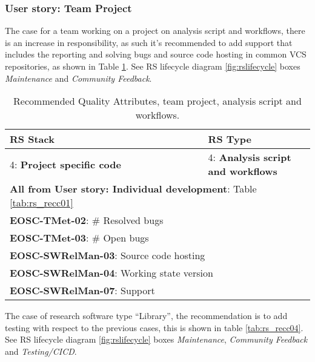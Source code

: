 \subsubsection{User story: Team Project}

The case for a team working on a project on analysis script and workflows, there is an increase in responsibility, as such it's recommended to add support that includes the reporting and solving bugs and source code hosting in common VCS repositories, as shown in Table \ref{tab:rs_recc03}. See RS lifecycle diagram \ref{fig:rslifecycle} boxes \textit{Maintenance} and \textit{Community Feedback}.

\begin{center}
\begin{table}
  \small
  \begin{tabular}{|p{0.65\linewidth}|p{0.35\linewidth}|} \hline

    \textbf{RS Stack} & \textbf{RS Type} \\ \hline \hline
    4: \textbf{Project specific code} &
    4: \textbf{Analysis script and workflows} \\ \hline \hline
    \multicolumn{2}{|l|}{\textbf{All from User story: Individual development}: Table \ref{tab:rs_recc01}} \\ \hline
    \multicolumn{2}{|l|}{\textbf{EOSC-TMet-02}: \# Resolved bugs} \\ \hline
    \multicolumn{2}{|l|}{\textbf{EOSC-TMet-03}: \# Open bugs} \\ \hline
    \multicolumn{2}{|l|}{\textbf{EOSC-SWRelMan-03}: Source code hosting} \\ \hline
    \multicolumn{2}{|l|}{\textbf{EOSC-SWRelMan-04}: Working state version} \\ \hline
    \multicolumn{2}{|l|}{\textbf{EOSC-SWRelMan-07}: Support} \\ \hline

  \end{tabular}
  \caption{Recommended Quality Attributes, team project, analysis script and workflows.}
  \label{tab:rs_recc03}
\end{table}
\end{center}

The case of research software type ``Library'', the recommendation is to add testing with respect to the previous cases, this is shown in table \ref{tab:rs_recc04}.
See RS lifecycle diagram \ref{fig:rslifecycle} boxes \textit{Maintenance}, \textit{Community Feedback} and \textit{Testing/CICD}.

